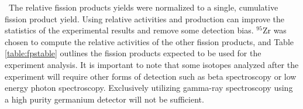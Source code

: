 \ The relative fission products yields were normalized to a single, cumulative fission product yield. 
Using relative activities and production can improve the statistics of the experimental results and remove some detection bias. 
$\mathrm{^{95}Zr}$ was chosen to compute the relative activities of the other fission products, and Table \ref{table:fpstable} outlines the fission products expected to be used for the experiment analysis.
It is important to note that some isotopes analyzed after the experiment will require other forms of detection such as beta spectroscopy or low energy photon spectroscopy.
Exclusively utilizing gamma-ray spectroscopy using a high purity germanium detector will not be sufficient. 
